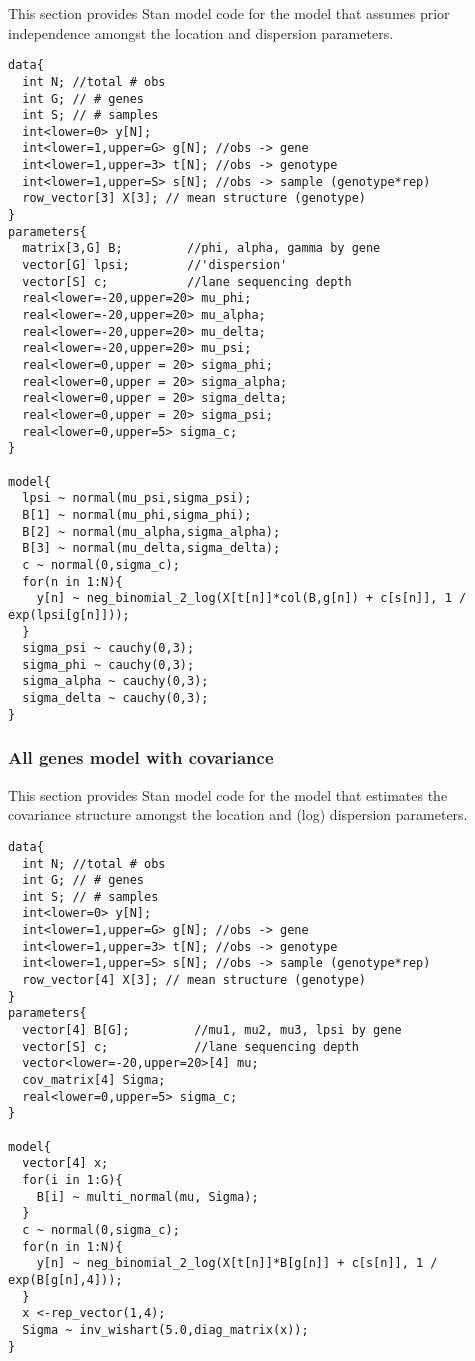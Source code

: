 \documentclass[useAMS,usenatbib,referee]{biom}
\begin{document}
This section provides Stan model code for the model that assumes prior independence amongst the location and dispersion parameters. 

\begin{verbatim}
data{
  int N; //total # obs
  int G; // # genes
  int S; // # samples
  int<lower=0> y[N];
  int<lower=1,upper=G> g[N]; //obs -> gene
  int<lower=1,upper=3> t[N]; //obs -> genotype
  int<lower=1,upper=S> s[N]; //obs -> sample (genotype*rep)
  row_vector[3] X[3]; // mean structure (genotype)
}
parameters{
  matrix[3,G] B;         //phi, alpha, gamma by gene
  vector[G] lpsi;        //'dispersion'
  vector[S] c;           //lane sequencing depth
  real<lower=-20,upper=20> mu_phi;
  real<lower=-20,upper=20> mu_alpha;
  real<lower=-20,upper=20> mu_delta;
  real<lower=-20,upper=20> mu_psi;
  real<lower=0,upper = 20> sigma_phi;
  real<lower=0,upper = 20> sigma_alpha;
  real<lower=0,upper = 20> sigma_delta;
  real<lower=0,upper = 20> sigma_psi;
  real<lower=0,upper=5> sigma_c;
}

model{
  lpsi ~ normal(mu_psi,sigma_psi);
  B[1] ~ normal(mu_phi,sigma_phi);
  B[2] ~ normal(mu_alpha,sigma_alpha);
  B[3] ~ normal(mu_delta,sigma_delta);
  c ~ normal(0,sigma_c);
  for(n in 1:N){
    y[n] ~ neg_binomial_2_log(X[t[n]]*col(B,g[n]) + c[s[n]], 1 / exp(lpsi[g[n]]));
  }
  sigma_psi ~ cauchy(0,3);
  sigma_phi ~ cauchy(0,3);
  sigma_alpha ~ cauchy(0,3);
  sigma_delta ~ cauchy(0,3);
}
\end{verbatim}

\subsubsection{All genes model with covariance}
\label{s:all_genes_model_with_covariance}

This section provides Stan model code for the model that estimates the covariance structure amongst the location and (log) dispersion parameters. 

\begin{verbatim}
data{
  int N; //total # obs
  int G; // # genes
  int S; // # samples
  int<lower=0> y[N];
  int<lower=1,upper=G> g[N]; //obs -> gene
  int<lower=1,upper=3> t[N]; //obs -> genotype
  int<lower=1,upper=S> s[N]; //obs -> sample (genotype*rep)
  row_vector[4] X[3]; // mean structure (genotype)
}
parameters{
  vector[4] B[G];         //mu1, mu2, mu3, lpsi by gene
  vector[S] c;            //lane sequencing depth
  vector<lower=-20,upper=20>[4] mu;
  cov_matrix[4] Sigma;
  real<lower=0,upper=5> sigma_c;
}

model{
  vector[4] x;
  for(i in 1:G){
    B[i] ~ multi_normal(mu, Sigma);
  }
  c ~ normal(0,sigma_c);
  for(n in 1:N){
    y[n] ~ neg_binomial_2_log(X[t[n]]*B[g[n]] + c[s[n]], 1 / exp(B[g[n],4]));
  }
  x <-rep_vector(1,4);
  Sigma ~ inv_wishart(5.0,diag_matrix(x));
}
\end{verbatim}
\end{document}
